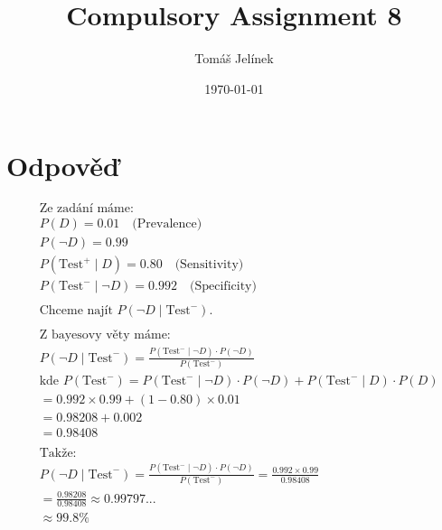 \documentclass{article}
\title{Compulsory Assignment 8}
\author{Tomáš Jelínek}
\date{\today}
\begin{document}
\maketitle
\section*{Odpověď}


\[
\begin{aligned}
&\text{Ze zadání máme:} \\
&P(D) = 0.01 \quad \text{(Prevalence)} \\
&P(\neg D) = 0.99 \\
&P(\text{Test}^+ \mid D) = 0.80 \quad \text{(Sensitivity)} \\
&P(\text{Test}^- \mid \neg D) = 0.992 \quad \text{(Specificity)} \\
\\
&\text{Chceme najít } P(\neg D \mid \text{Test}^-). \\
\\
&\text{Z bayesovy věty máme:}
\\
&P(\neg D \mid \text{Test}^-) = \frac{P(\text{Test}^- \mid \neg D) \cdot P(\neg D)}{P(\text{Test}^-)} \\
&\text{kde } P(\text{Test}^-) = P(\text{Test}^- \mid \neg D) \cdot P(\neg D) + P(\text{Test}^- \mid D) \cdot P(D) \\
&= 0.992 \times 0.99 + (1 - 0.80) \times 0.01 \\
&= 0.98208 + 0.002 \\
&= 0.98408 \\
\\
&\text{Takže:}
\\
&P(\neg D \mid \text{Test}^-) = \frac{P(\text{Test}^- \mid \neg D) \cdot P(\neg D)}{P(\text{Test}^-)} = \frac{0.992 \times 0.99}{0.98408} \\
&= \frac{0.98208}{0.98408} \approx 0.99797... \\
&\approx 99.8\%
\end{aligned}
\]
\end{document}
